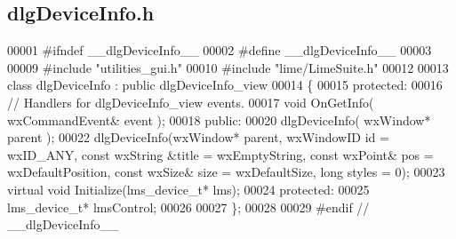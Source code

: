 \subsection{dlg\+Device\+Info.\+h}
\label{dlgDeviceInfo_8h_source}

\begin{DoxyCode}
00001 \textcolor{preprocessor}{#ifndef \_\_dlgDeviceInfo\_\_}
00002 \textcolor{preprocessor}{#define \_\_dlgDeviceInfo\_\_}
00003 
00009 \textcolor{preprocessor}{#include "utilities_gui.h"}
00010 \textcolor{preprocessor}{#include "lime/LimeSuite.h"}
00012 
00013 \textcolor{keyword}{class }dlgDeviceInfo : \textcolor{keyword}{public} dlgDeviceInfo_view
00014 \{
00015     \textcolor{keyword}{protected}:
00016         \textcolor{comment}{// Handlers for dlgDeviceInfo\_view events.}
00017         \textcolor{keywordtype}{void} OnGetInfo( wxCommandEvent& event );
00018     \textcolor{keyword}{public}:
00020         dlgDeviceInfo( wxWindow* parent );
00022         dlgDeviceInfo(wxWindow* parent, wxWindowID \textcolor{keywordtype}{id} = wxID\_ANY, \textcolor{keyword}{const} wxString &title = wxEmptyString, \textcolor{keyword}{
      const} wxPoint& pos = wxDefaultPosition, \textcolor{keyword}{const} wxSize& size = wxDefaultSize, \textcolor{keywordtype}{long} styles = 0);
00023         \textcolor{keyword}{virtual} \textcolor{keywordtype}{void} Initialize(lms_device_t* lms);
00024     \textcolor{keyword}{protected}:
00025         lms_device_t* lmsControl;
00026 
00027 \};
00028 
00029 \textcolor{preprocessor}{#endif // \_\_dlgDeviceInfo\_\_}
\end{DoxyCode}
